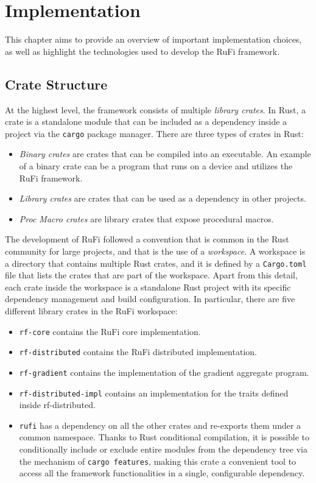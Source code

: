 
\chapter{Implementation}
\label{chap:Implementation}
This chapter aims to provide an overview of important implementation choices, as well as highlight the technologies used to develop the RuFi framework.

\section{Crate Structure}
At the highest level, the framework consists of multiple \textit{library crates}. In Rust, a crate is a standalone module that can be included as a dependency inside a project via
the \texttt{cargo} package manager. There are three types of crates in Rust:

\begin{itemize}
    \item \textit{Binary crates} are crates that can be compiled into an executable.
          An example of a binary crate can be a program that runs on a device and utilizes the RuFi framework.
    \item \textit{Library crates} are crates that can be used as a dependency in other projects.
    \item \textit{Proc Macro crates} are library crates that expose procedural macros.
\end{itemize}

The development of RuFi followed a convention that is common in the Rust community for large projects, and that is the use of a \textit{workspace}.
A workspace is a directory that contains multiple Rust crates, and it is defined by a \texttt{Cargo.toml} file that lists the crates that are part of the workspace.
Apart from this detail, each crate inside the workspace is a standalone Rust project with its specific dependency management and build configuration.
In particular, there are five different library crates in the RuFi workspace:

\begin{itemize}
    \item \texttt{rf-core} contains the RuFi core implementation.
    \item \texttt{rf-distributed} contains the RuFi distributed implementation.
    \item \texttt{rf-gradient} contains the implementation of the gradient aggregate program.
    \item \texttt{rf-distributed-impl} contains an implementation for the traits defined inside rf-distributed.
    \item \texttt{rufi} has a dependency on all the other crates and re-exports them under a common namespace. Thanks to Rust conditional compilation,
          it is possible to conditionally include or exclude entire modules from the dependency tree via the mechanism of \texttt{cargo features}, making this
          crate a convenient tool to access all the framework functionalities in a single, configurable dependency.
\end{itemize}


